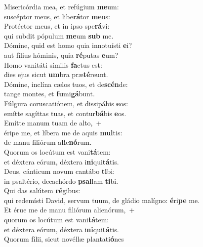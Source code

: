 \evenverse Misericórdia mea, et refúgium \textbf{me}um:~\*\\
\evenverse suscéptor meus, et libe\textbf{rá}tor \textbf{me}us:\\
\oddverse Protéctor meus, et in ipso spe\textbf{rá}vi:~\*\\
\oddverse qui subdit pópulum \textbf{me}um \textbf{sub} me.\\
\evenverse Dómine, quid est homo quia innotuísti \textbf{e}i?~\*\\
\evenverse aut fílius hóminis, quia \textbf{ré}putas \textbf{e}um?\\
\oddverse Homo vanitáti símilis \textbf{fa}ctus est:~\*\\
\oddverse dies ejus sicut \textbf{um}bra præ\textbf{té}reunt.\\
\evenverse Dómine, inclína cælos tuos, et de\textbf{scén}de:~\*\\
\evenverse tange montes, et \textbf{fu}mi\textbf{gá}bunt.\\
\oddverse Fúlgura coruscatiónem, et dissipábis \textbf{e}os:~\*\\
\oddverse emítte sagíttas tuas, et contur\textbf{bá}bis \textbf{e}os.\\
\evenverse Emítte manum tuam de alto,~+\\
\evenverse  éripe me, et líbera me de aquis \textbf{mul}tis:~\*\\
\evenverse de manu filiórum a\textbf{li}e\textbf{nó}rum.\\
\oddverse Quorum os locútum est vani\textbf{tá}tem:~\*\\
\oddverse et déxtera eórum, déxtera i\textbf{ni}qui\textbf{tá}tis.\\
\evenverse Deus, cánticum novum cantábo \textbf{ti}bi:~\*\\
\evenverse in psaltério, decachórdo \textbf{psal}lam \textbf{ti}bi.\\
\oddverse Qui das salútem \textbf{ré}gibus:~\*\\
\oddverse qui redemísti David, servum tuum, de gládio malígno: \textbf{é}ri\textbf{pe} me.\\
\evenverse Et érue me de manu filiórum alienórum,~+\\
\evenverse  quorum os locútum est vani\textbf{tá}tem:~\*\\
\evenverse et déxtera eórum, déxtera i\textbf{ni}qui\textbf{tá}tis.\\
\oddverse Quorum fílii, sicut novéllæ plantati\textbf{ó}nes~\*\\
